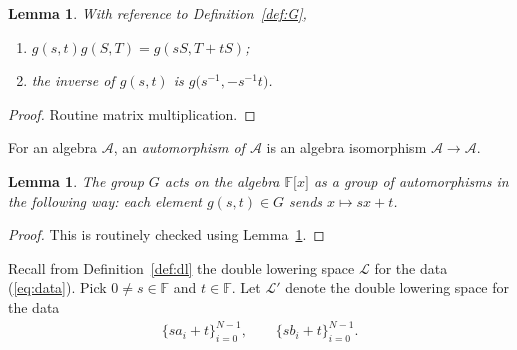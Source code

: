\documentclass[pdftex]{sigma}
\numberwithin{equation}{section}
\newtheorem{Lemma}[Theorem]{Lemma}
\begin{document}
\begin{Lemma}\label{lem:group}
With reference to Definition~{\rm \ref{def:G}},
\begin{enumerate}\itemsep=0pt
\item[$(i)$]
$g(s,t) g(S,T) = g(sS,T+tS)$;
\item[$(ii)$]
the inverse of $g(s,t)$ is $g\big(s^{-1}, -s^{-1}t\big)$.
\end{enumerate}
\end{Lemma}
\begin{proof} Routine matrix multiplication.
\end{proof}

For an algebra $\mathcal A$, an {\it automorphism of
$\mathcal A$} is an algebra isomorphism $\mathcal A\to \mathcal A$.

\begin{Lemma} The group $G$ acts on the algebra
${\mathbb F}\lbrack x \rbrack$ as a group of automorphisms
in the following way: each element $g(s,t) \in G$ sends
$x \mapsto s x + t$.
\end{Lemma}
\begin{proof} This is routinely checked using
Lemma~\ref{lem:group}.
\end{proof}


Recall
from Definition~\ref{def:dl}
the double lowering space
$\mathcal L$ for the data
(\ref{eq:data}).
Pick $0 \not=s\in \mathbb F$ and $t\in \mathbb F$.
Let $\mathcal L'$ denote the double lowering space for the data
\begin{gather*}%
\lbrace sa_i + t\rbrace_{i=0}^{N-1}, \qquad
\lbrace sb_i + t\rbrace_{i=0}^{N-1}.
\end{gather*}
\end{document}
